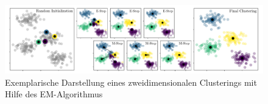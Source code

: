 \begin{figure}[H]
    \centering
    \includegraphics[width=\textwidth]{Bilder/expectation-maximization}
    \caption{Exemplarische Darstellung eines zweidimensionalen Clusterings mit Hilfe des EM-Algorithmus \cite{VanderPlas2016}}\label{fig:k-means}
\end{figure}